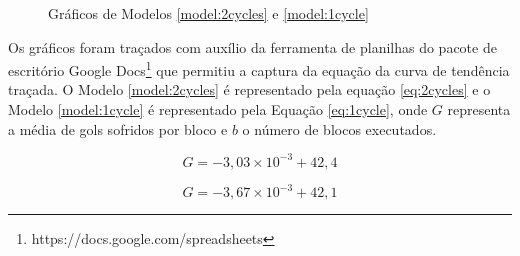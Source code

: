 \begin{figure}[!htb]
\centering
    \caption{\label{img:graph} Gráficos de Modelos \ref{model:2cycles} e \ref{model:1cycle}}
    \qquad
    \vspace{1.5em}
\end{figure}

Os gráficos foram traçados com auxílio da ferramenta de planilhas do pacote de
escritório Google Docs\footnote{https://docs.google.com/spreadsheets} que
permitiu a captura da equação da curva de tendência traçada. O Modelo
\ref{model:2cycles} é representado pela equação \ref{eq:2cycles} e o Modelo
\ref{model:1cycle} é representado pela Equação \ref{eq:1cycle}, onde $G$
representa a média de gols sofridos por bloco e $b$ o número de blocos executados.

\begin{equation}
    \label{eq:2cycles}
    G=-3,03\times 10^{-3}+42,4
\end{equation}

\begin{equation}
    \label{eq:1cycle}
    G=-3,67\times 10^{-3}+42,1
\end{equation}